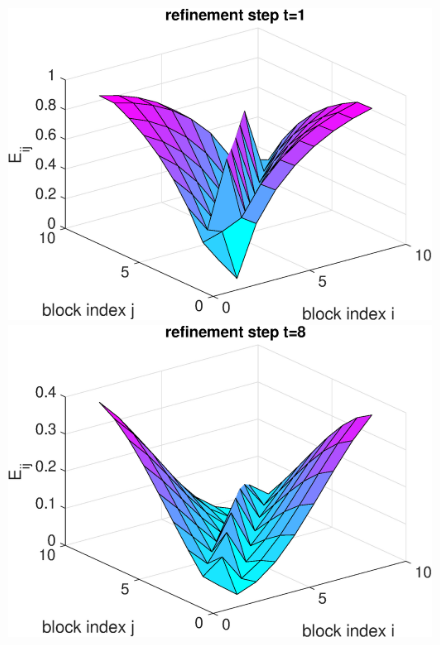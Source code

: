 \begin{example}
{\begin{figure}[h!]
\centering
\hspace*{2em}
\begin{minipage}[t]{0.48\linewidth}
\centering
\includegraphics[width=0.99\linewidth]{figures/9times9_Z4_Error_t1.eps}
\end{minipage}
%
\begin{minipage}[t]{0.48\linewidth}
\includegraphics[width=0.99\linewidth]{figures/9times9_Z4_Error_t8.eps}
\end{minipage}
\\\vspace{4em}
\begin{minipage}[t]{0.48\linewidth}
\centering

\end{minipage}
\end{figure}}
\end{example}
